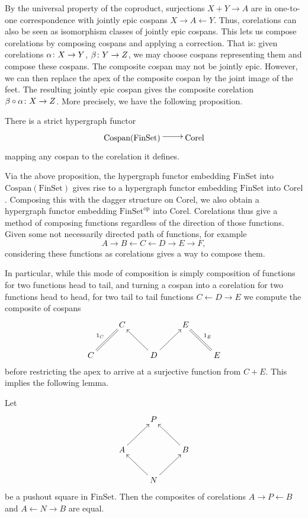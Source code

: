 By the universal property of the coproduct, surjections $X+Y \to A$ are in
one-to-one correspondence with jointly epic cospans $X \rightarrow A \leftarrow
Y$.   Thus, corelations can also be seen as isomorphism classes of jointly epic
cospans.  This lets us compose corelations by composing cospans and applying a
correction.  That is: given corelations $\alpha{\colon} X \to Y$, $\beta{\colon} Y \to
Z$, we may choose cospans representing them and compose these cospans.   The
composite cospan may not be jointly epic.  However, we can then replace the apex
of the composite cospan by the joint image of the feet.  The resulting jointly
epic cospan gives the composite corelation $\beta \circ \alpha{\colon} X \to Z$.
More precisely, we have the following proposition.

\begin{proposition}
  There is a strict hypergraph functor
  \[
    \xymatrix{
      \mathrm{Cospan(FinSet)}  \ar@<.5ex>[r] & \mathrm{Corel} 
    }
  \]
  mapping any cospan to the corelation it defines.
\end{proposition}

Via the above proposition, the hypergraph functor embedding $\mathrm{FinSet}$
into $\mathrm{Cospan(FinSet)}$ gives rise to a hypergraph functor embedding
$\mathrm{FinSet}$ into $\mathrm{Corel}$.  Composing this with the dagger
structure on $\mathrm{Corel}$, we also obtain a hypergraph functor embedding
$\mathrm{FinSet}^{\mathrm{op}}$ into $\mathrm{Corel}$.  Corelations thus give a
method of composing functions regardless of the direction of those functions.
Given some not necessarily directed path of functions, for example
\[
  A \longrightarrow B \longleftarrow C \longleftarrow D \longrightarrow E
  \longrightarrow F,
\]
considering these functions as corelations gives a way to compose them.

In particular, while this mode of composition is simply composition of functions
for two functions head to tail, and turning a cospan into a corelation for two
functions head to head, for two tail to tail functions $C \leftarrow D
\rightarrow E$ we compute the composite of cospans
\[
  \xymatrix{
  & C && E \\
  C \ar@{=}[ur]^{1_C} && D \ar[ul] \ar[ur] && E \ar@{=}[ul]_{1_E}
  }
\]
before restricting the apex to arrive at a surjective function from $C+E$. This
implies the following lemma. 

\begin{lemma} \label{lem:pushoutcorelations}
  Let 
\[
  \xymatrix{
    & P \\
    A \ar[ur] && B \ar[ul] \\
    & N \ar[ur] \ar[ul]
  }
\]
be a pushout square in $\mathrm{FinSet}$. Then the composites of corelations $A
\rightarrow P \leftarrow B$ and $A \leftarrow N \rightarrow B$ are equal.
\end{lemma}

